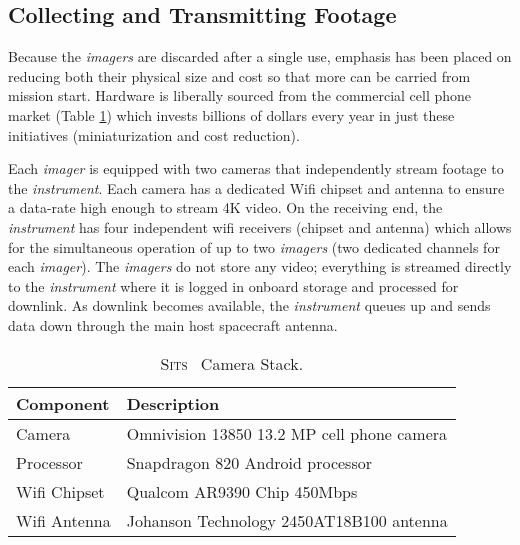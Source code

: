 \documentclass{tufte-handout}
\newcommand{\sitsshort}[0]{\textsc{Sits}}%
\begin{document}
\subsection{Collecting and Transmitting Footage}

Because the \textit{imagers} are discarded after a single use, emphasis has been placed on 
reducing both their physical size and cost so that more can be carried from 
mission start. Hardware is liberally sourced from the commercial cell 
phone market (Table \ref{tab:camstack}) which invests billions of dollars 
every year in just these initiatives (miniaturization and cost reduction). 

Each \textit{imager} is equipped with two cameras that independently stream
footage to the \textit{instrument}. Each camera has a dedicated Wifi chipset and
antenna to ensure a data-rate high enough to stream 4K video. On the receiving
end, the \textit{instrument} has four independent wifi receivers (chipset and antenna) which 
allows for the simultaneous operation of up to two \textit{imagers} (two dedicated 
channels for each \textit{imager}). The \textit{imagers} do not store any video; everything is 
streamed directly to the \textit{instrument} where it is logged in onboard storage and 
processed for downlink. As downlink becomes available, the \textit{instrument} queues 
up and sends data down through the main host spacecraft antenna.

\begin{table}
  \selectfont
  \begin{tabular}{ll}
    \toprule
    Component & Description \\
    \midrule
    Camera &  Omnivision 13850 13.2 MP cell phone camera\\
    Processor & Snapdragon 820 Android processor \\
    Wifi Chipset & Qualcom AR9390 Chip 450Mbps \\ 
    Wifi Antenna & Johanson Technology 2450AT18B100 antenna\\
   \bottomrule
  \end{tabular}
  \caption{\sitsshort~ Camera Stack.}
  \label{tab:camstack}
\end{table}
\end{document}
